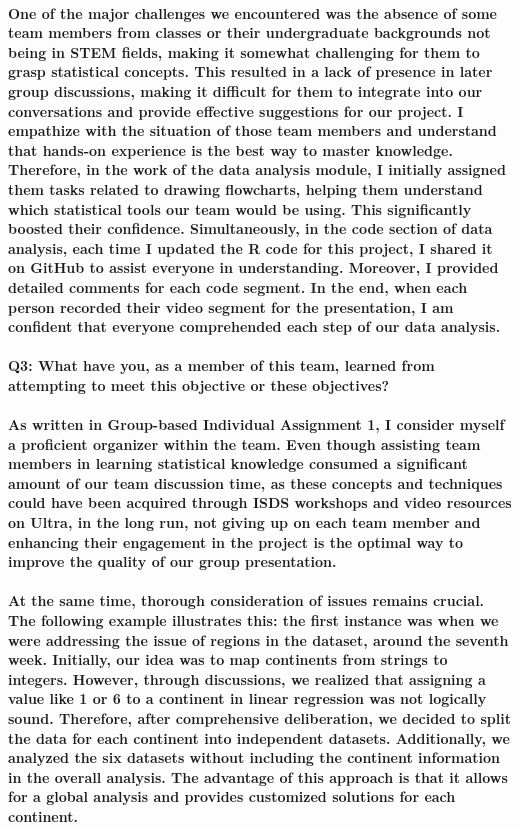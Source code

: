 \documentclass[11pt]{article} %
\begin{document}
\paragraph{One of the major challenges we encountered was the absence of some team members from classes or their undergraduate backgrounds not being in STEM fields, making it somewhat challenging for them to grasp statistical concepts. This resulted in a lack of presence in later group discussions, making it difficult for them to integrate into our conversations and provide effective suggestions for our project. I empathize with the situation of those team members and understand that hands-on experience is the best way to master knowledge. Therefore, in the work of the data analysis module, I initially assigned them tasks related to drawing flowcharts, helping them understand which statistical tools our team would be using. This significantly boosted their confidence. Simultaneously, in the code section of data analysis, each time I updated the R code for this project, I shared it on GitHub to assist everyone in understanding. Moreover, I provided detailed comments for each code segment. In the end, when each person recorded their video segment for the presentation, I am confident that everyone comprehended each step of our data analysis.}
% 
% 
\paragraph{\textbf{Q3: What have you, as a member of this team, learned from attempting to meet this objective or these objectives?}}
% 
% 
\paragraph{As written in Group-based Individual Assignment 1, I consider myself a proficient organizer within the team. Even though assisting team members in learning statistical knowledge consumed a significant amount of our team discussion time, as these concepts and techniques could have been acquired through ISDS workshops and video resources on Ultra, in the long run, not giving up on each team member and enhancing their engagement in the project is the optimal way to improve the quality of our group presentation.}
% 
\paragraph{At the same time, thorough consideration of issues remains crucial. The following example illustrates this: the first instance was when we were addressing the issue of regions in the dataset, around the seventh week. Initially, our idea was to map continents from strings to integers. However, through discussions, we realized that assigning a value like 1 or 6 to a continent in linear regression was not logically sound. Therefore, after comprehensive deliberation, we decided to split the data for each continent into independent datasets. Additionally, we analyzed the six datasets without including the continent information in the overall analysis. The advantage of this approach is that it allows for a global analysis and provides customized solutions for each continent.}
% 
% 
\end{document}

